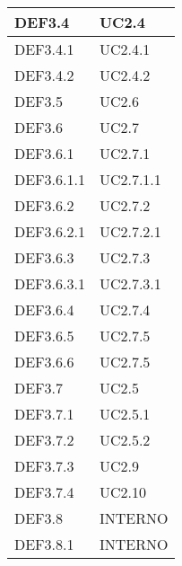 \documentclass{scalatekids-article}
\begin{document}
\begin{longtable}[H]{|p{5.5cm}|p{5.5cm}|}
\hline
DEF3.4 & \multiLineCell[t]{UC2.4\\}\\
\hline
DEF3.4.1 & \multiLineCell[t]{UC2.4.1\\}\\
\hline
DEF3.4.2 & \multiLineCell[t]{UC2.4.2\\}\\
\hline
DEF3.5 & \multiLineCell[t]{UC2.6\\}\\
\hline
DEF3.6 & \multiLineCell[t]{UC2.7\\}\\
\hline
DEF3.6.1 & \multiLineCell[t]{UC2.7.1\\}\\
\hline
DEF3.6.1.1 & \multiLineCell[t]{UC2.7.1.1\\}\\
\hline
DEF3.6.2 & \multiLineCell[t]{UC2.7.2\\}\\
\hline
DEF3.6.2.1 & \multiLineCell[t]{UC2.7.2.1\\}\\
\hline
DEF3.6.3 & \multiLineCell[t]{UC2.7.3\\}\\
\hline
DEF3.6.3.1 & \multiLineCell[t]{UC2.7.3.1\\}\\
\hline
DEF3.6.4 & \multiLineCell[t]{UC2.7.4\\}\\
\hline
DEF3.6.5 & \multiLineCell[t]{UC2.7.5\\}\\
\hline
DEF3.6.6 & \multiLineCell[t]{UC2.7.5\\}\\
\hline
DEF3.7 & \multiLineCell[t]{UC2.5\\}\\
\hline
DEF3.7.1 & \multiLineCell[t]{UC2.5.1\\}\\
\hline
DEF3.7.2 & \multiLineCell[t]{UC2.5.2\\}\\
\hline
DEF3.7.3 & \multiLineCell[t]{UC2.9\\}\\
\hline
DEF3.7.4 & \multiLineCell[t]{UC2.10\\}\\
\hline
DEF3.8 & \multiLineCell[t]{INTERNO\\}\\
\hline
DEF3.8.1 & \multiLineCell[t]{INTERNO\\}\\

\end{longtable}
\end{document}
